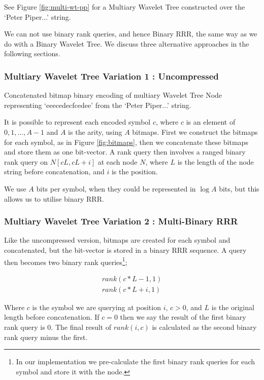 See Figure \ref{fig:multi-wt-pp} for a Multiary Wavelet Tree constructed over
the `Peter Piper...' string.

We can not use binary rank queries, and hence Binary RRR, the same way as we do 
with a Binary Wavelet Tree. We discuss three alternative approaches in the 
following sections.

\subsubsection{Multiary Wavelet Tree Variation 1 : Uncompressed}
		{Concatenated bitmap binary encoding of multiary Wavelet Tree Node
		representing `eeecedecfcedee' from the `Peter Piper...' string.}
		
It is possible to represent each encoded symbol $c$, where $c$ is an element of
${ 0, 1,..., A - 1}$ and $A$ is the arity, using $A$ bitmaps. First we construct
the bitmaps for each symbol, as in Figure \ref{fig:bitmaps}, then we concatenate 
these bitmaps and store them as one 
bit-vector. A rank query then involves a ranged binary rank query on $N[c L, c L 
+ i]$ at each node $N$, where $L$ is the length of the node string before 
concatenation, and $i$ is the position.

We use $A$ bits per symbol, when they could be represented in $\log A$ bits, but
this allows us to utilise binary RRR.

\subsubsection{Multiary Wavelet Tree Variation 2 : Multi-Binary RRR}
\label{sec:multi-bin-rrr}
Like the uncompressed version, bitmaps are created for each symbol and 
concatenated, but the bit-vector is stored in a binary RRR sequence. A query 
then becomes two binary rank queries\footnote{In our implementation we 
pre-calculate the first binary rank queries for each symbol and store it with 
the node.};

	\begin{align}
	rank(c * L - 1, 1) \\
	rank(c * L + i, 1)
	\end{align}

Where $c$ is the symbol we are querying at position $i$,
$c > 0$, and $L$ is 
the original length before concatenation. If $c = 0$ then we say the result of 
the first binary rank query is $0$. The final result of $rank(i, c)$ is 
calculated as the second binary rank query minus the first.


